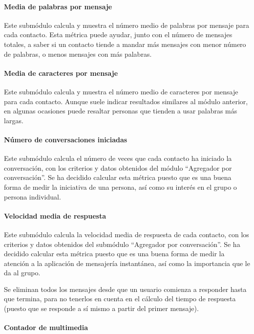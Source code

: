 \paragraph{Media de palabras por mensaje}

Este submódulo calcula y muestra el número medio de palabras por mensaje para cada contacto. Esta métrica puede ayudar, junto con el número de mensajes totales, a saber si un contacto tiende a mandar más mensajes con menor número de palabras, o menos mensajes con más palabras.


\paragraph{Media de caracteres por mensaje}

Este submódulo calcula y muestra el número medio de caracteres por mensaje para cada contacto. Aunque suele indicar resultados similares al módulo anterior, en algunas ocasiones puede resaltar personas que tienden a usar palabras más largas.


\paragraph{Número de conversaciones iniciadas}

Este submódulo calcula el número de veces que cada contacto ha iniciado la conversación, con los criterios y datos obtenidos del módulo ``Agregador por conversación''. Se ha decidido calcular esta métrica puesto que es una buena forma de medir la iniciativa de una persona, así como su interés en el grupo o persona individual.


\paragraph{Velocidad media de respuesta}

Este submódulo calcula la velocidad media de respuesta de cada contacto, con los criterios y datos obtenidos del submódulo ``Agregador por conversación''. Se ha decidido calcular esta métrica puesto que es una buena forma de medir la atención a la aplicación de mensajería instantánea, así como la importancia que le da al grupo.

Se eliminan todos los  mensajes desde que un usuario comienza a responder hasta que termina, para no tenerlos en cuenta en el cálculo del tiempo de respuesta (puesto que se responde a sí mismo a partir del primer mensaje).


\paragraph{Contador de multimedia}

